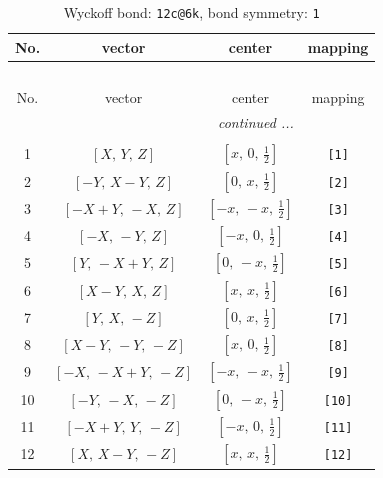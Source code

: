 \documentclass[fleqn,8pt]{jsarticle}
\begin{document}
\begin{longtable}{cccc}
\caption{Wyckoff bond: {\tt 12c@6k}, bond symmetry: {\tt 1}}
 \\
 \hline \hline
No. & vector & center & mapping \\ \hline \endfirsthead

\multicolumn{3}{l}{\tablename\ \thetable{}} \\
 \hline \hline
No. & vector & center & mapping \\ \hline \endhead

 \hline \hline
\multicolumn{3}{r}{\footnotesize\it continued ...} \\ \endfoot

 \hline \hline
\multicolumn{3}{r}{} \\ \endlastfoot

1 & $\left[ X,\, Y,\, Z \right]$ & $\left[ x,\, 0,\, \frac{1}{2} \right]$ & {\tt [1]} \\ \hline
2 & $\left[ - Y,\, X - Y,\, Z \right]$ & $\left[ 0,\, x,\, \frac{1}{2} \right]$ & {\tt [2]} \\ \hline
3 & $\left[ - X + Y,\, - X,\, Z \right]$ & $\left[ - x,\, - x,\, \frac{1}{2} \right]$ & {\tt [3]} \\ \hline
4 & $\left[ - X,\, - Y,\, Z \right]$ & $\left[ - x,\, 0,\, \frac{1}{2} \right]$ & {\tt [4]} \\ \hline
5 & $\left[ Y,\, - X + Y,\, Z \right]$ & $\left[ 0,\, - x,\, \frac{1}{2} \right]$ & {\tt [5]} \\ \hline
6 & $\left[ X - Y,\, X,\, Z \right]$ & $\left[ x,\, x,\, \frac{1}{2} \right]$ & {\tt [6]} \\ \hline
7 & $\left[ Y,\, X,\, - Z \right]$ & $\left[ 0,\, x,\, \frac{1}{2} \right]$ & {\tt [7]} \\ \hline
8 & $\left[ X - Y,\, - Y,\, - Z \right]$ & $\left[ x,\, 0,\, \frac{1}{2} \right]$ & {\tt [8]} \\ \hline
9 & $\left[ - X,\, - X + Y,\, - Z \right]$ & $\left[ - x,\, - x,\, \frac{1}{2} \right]$ & {\tt [9]} \\ \hline
10 & $\left[ - Y,\, - X,\, - Z \right]$ & $\left[ 0,\, - x,\, \frac{1}{2} \right]$ & {\tt [10]} \\ \hline
11 & $\left[ - X + Y,\, Y,\, - Z \right]$ & $\left[ - x,\, 0,\, \frac{1}{2} \right]$ & {\tt [11]} \\ \hline
12 & $\left[ X,\, X - Y,\, - Z \right]$ & $\left[ x,\, x,\, \frac{1}{2} \right]$ & {\tt [12]} \\
\end{longtable}
\end{document}
